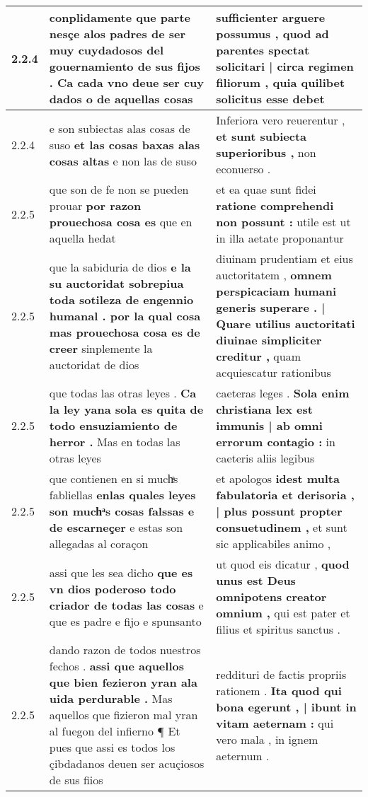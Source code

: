 \begin{tabular}{|p{1cm}|p{6.5cm}|p{6.5cm}|}
2.2.4 & conplidamente \textbf{ que parte nesçe alos padres de ser muy cuydadosos del gouernamiento de sus fijos . } Ca cada vno deue ser cuy dados o de aquellas cosas & sufficienter arguere possumus , \textbf{ quod ad parentes spectat solicitari | circa regimen filiorum , } quia quilibet solicitus esse debet \\\hline
2.2.4 & e son subiectas alas cosas de suso \textbf{ et las cosas baxas alas cosas altas } e non las de suso & Inferiora vero reuerentur , \textbf{ et sunt subiecta superioribus , } non econuerso . \\\hline
2.2.5 & que son de fe non se pueden prouar \textbf{ por razon prouechosa cosa es } que en aquella hedat & et ea quae sunt fidei \textbf{ ratione comprehendi non possunt : } utile est ut in illa aetate proponantur \\\hline
2.2.5 & que la sabiduria de dios \textbf{ e la su auctoridat sobrepiua toda sotileza de engennio humanal . por la qual cosa mas prouechosa cosa es de creer } sinplemente la auctoridat de dios & diuinam prudentiam et eius auctoritatem , \textbf{ omnem perspicaciam humani generis superare . | Quare utilius auctoritati diuinae simpliciter creditur , } quam acquiescatur rationibus \\\hline
2.2.5 & que todas las otras leyes . \textbf{ Ca la ley yana sola es quita de todo ensuziamiento de herror . } Mas en todas las otras leyes & caeteras leges . \textbf{ Sola enim christiana lex est immunis | ab omni errorum contagio : } in caeteris aliis legibus \\\hline
2.2.5 & que contienen en si muchͣs fabliellas \textbf{ enlas quales leyes son muchͣs cosas falssas e de escarneçer } e estas son allegadas al coraçon & et apologos \textbf{ idest multa fabulatoria et derisoria , | plus possunt propter consuetudinem , } et sunt sic applicabiles animo , \\\hline
2.2.5 & assi que les sea dicho \textbf{ que es vn dios poderoso todo criador de todas las cosas } e que es padre e fijo e spunsanto & ut quod eis dicatur , \textbf{ quod unus est Deus omnipotens creator omnium , } qui est pater et filius et spiritus sanctus . \\\hline
2.2.5 & dando razon de todos nuestros fechos . \textbf{ assi que aquellos que bien fezieron yran ala uida perdurable . } Mas aquellos que fizieron mal yran al fuegon del infierno ¶ Et pues que assi es todos los çibdadanos deuen ser acuçiosos de sus fiios & reddituri de factis propriis rationem . \textbf{ Ita quod qui bona egerunt , | ibunt in vitam aeternam : } qui vero mala , in ignem aeternum . \\\hline

\end{tabular}
